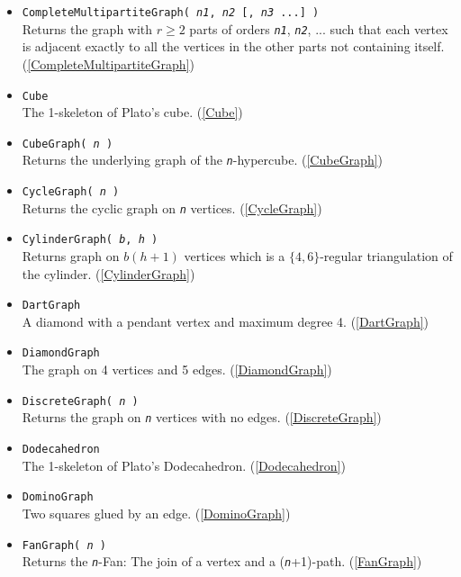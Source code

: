 \documentclass[a4paper,11pt]{report}
\begin{document}
{{\begin{itemize}
\item \texttt{CompleteMultipartiteGraph( \mbox{\texttt{\mdseries\slshape n1}}, \mbox{\texttt{\mdseries\slshape n2}} [, \mbox{\texttt{\mdseries\slshape n3}} ...] )}\\
 Returns the graph with $r\geq 2$ parts of orders \mbox{\texttt{\mdseries\slshape n1}}, \mbox{\texttt{\mdseries\slshape n2}}, ... such that each vertex is adjacent exactly to all the vertices in the
other parts not containing itself. (\ref{CompleteMultipartiteGraph}) 
\item \texttt{Cube}\\
 The 1-skeleton of Plato's cube. (\ref{Cube}) 
\item \texttt{CubeGraph( \mbox{\texttt{\mdseries\slshape n}} )}\\
 Returns the underlying graph of the \mbox{\texttt{\mdseries\slshape n}}-hypercube. (\ref{CubeGraph}) 
\item \texttt{CycleGraph( \mbox{\texttt{\mdseries\slshape n}} )}\\
 Returns the cyclic graph on \mbox{\texttt{\mdseries\slshape n}} vertices. (\ref{CycleGraph}) 
\item \texttt{CylinderGraph( \mbox{\texttt{\mdseries\slshape b}}, \mbox{\texttt{\mdseries\slshape h}} )}\\
 Returns graph on $b(h+1)$ vertices which is a $\{4,6\}$-regular triangulation of the cylinder. (\ref{CylinderGraph}) 
\item \texttt{DartGraph}\\
 A diamond with a pendant vertex and maximum degree 4. (\ref{DartGraph}) 
\item \texttt{DiamondGraph}\\
 The graph on 4 vertices and 5 edges. (\ref{DiamondGraph}) 
\item \texttt{DiscreteGraph( \mbox{\texttt{\mdseries\slshape n}} )}\\
 Returns the graph on \mbox{\texttt{\mdseries\slshape n}} vertices with no edges. (\ref{DiscreteGraph}) 
\item \texttt{Dodecahedron}\\
 The 1-skeleton of Plato's Dodecahedron. (\ref{Dodecahedron}) 
\item \texttt{DominoGraph}\\
 Two squares glued by an edge. (\ref{DominoGraph}) 
\item \texttt{FanGraph( \mbox{\texttt{\mdseries\slshape n}} )}\\
 Returns the \mbox{\texttt{\mdseries\slshape n}}-Fan: The join of a vertex and a (\mbox{\texttt{\mdseries\slshape n}}+1)-path. (\ref{FanGraph}) 

\end{itemize}}}
\end{document}
